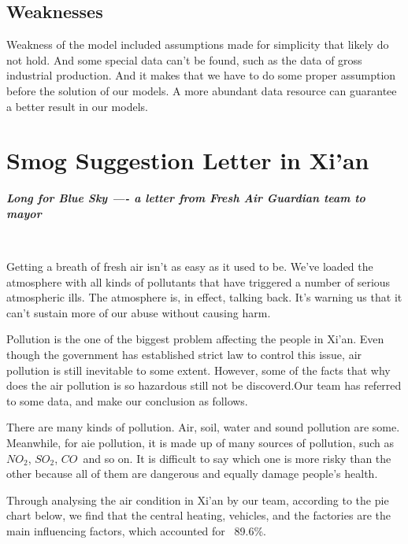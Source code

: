 \documentclass[a4paper,11pt]{article}
\begin{document}
\subsection{Weaknesses}
\par Weakness of the model included assumptions made for simplicity that likely do not hold. And some special data can't be found, such as the data of gross industrial production. And it makes that we have to do some proper assumption before the solution of our models. A more abundant data resource can guarantee a better result in our models.

\section{Smog Suggestion Letter in Xi'an}
\textbf{\Large{\emph{Long for Blue Sky ---- a letter from Fresh Air Guardian team to mayor}}}
\par   ~~~~~~~~~~
\textrm{\\}
\par Getting a breath of fresh air isn't as easy as it used to be. We've loaded the atmosphere with all kinds of pollutants that have triggered a number of serious atmospheric ills. The atmosphere is, in effect, talking back. It's warning us that it can't sustain more of our abuse without causing harm.

\par Pollution is the one of the biggest problem affecting the people in Xi'an. Even though the government has established strict law to control this issue, air pollution is still inevitable to some extent. However, some of the facts that why does the air pollution is so hazardous still not be discoverd.Our team has referred to some data, and make our conclusion as follows.
\par There are many kinds of pollution. Air, soil, water and sound pollution are some. Meanwhile, for aie pollution, it is made up of many sources of pollution, such as $NO_2$, $SO_2$, $CO$~and so on. It is difficult to say which one is more risky than the other because all of them are dangerous and equally damage people's health.
\par Through analysing the air condition in Xi'an by our team, according to the pie chart below, we find that the central heating, vehicles, and the factories are the main influencing factors, which accounted for ~89.6\%.
\end{document}

